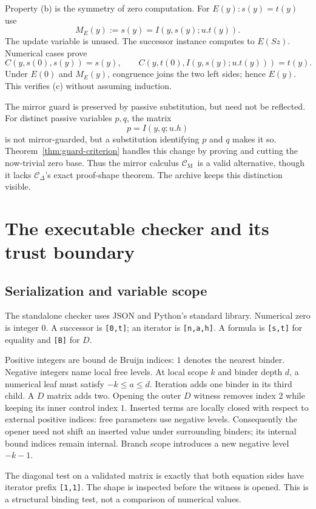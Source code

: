 \documentclass[11pt]{article}
\theoremstyle{definition}\newtheorem{definition}[theorem]{Definition}
\theoremstyle{remark}\newtheorem{remark}[theorem]{Remark}
\newcommand{\Cd}{\ensuremath{\mathcal C_{\Delta}}}
\newcommand{\Cm}{\ensuremath{\mathcal C_{\mathrm M}}}
\begin{document}
Property (b) is the symmetry of zero computation. For $E(y):s(y)=t(y)$ use
\[
 M_E(y):=s(y)=I(y,s(y);u.t(y)).
\]
The update variable is unused. The successor instance computes to $E(Sz)$. Numerical cases prove
\[
 C(y,s(0),s(y))=s(y),\qquad
 C(y,t(0),I(y,s(y);u.t(y)))=t(y).
\]
Under $E(0)$ and $M_E(y)$, congruence joins the two left sides; hence $E(y)$. This verifies (c) without assuming induction.

The mirror guard is preserved by passive substitution, but need not be reflected. For distinct passive variables $p,q$, the matrix
\[
 p=I(y,q;u.h)
\]
is not mirror-guarded, but a substitution identifying $p$ and $q$ makes it so. Theorem~\ref{thm:guard-criterion} handles this change by proving and cutting the now-trivial zero base. Thus the mirror calculus \Cm\ is a valid alternative, though it lacks \Cd's exact proof-shape theorem. The archive keeps this distinction visible.

\section{The executable checker and its trust boundary}
\label{sec:implementation}

\subsection{Serialization and variable scope}

The standalone checker uses JSON and Python's standard library. Numerical zero is integer $0$. A successor is \texttt{[0,t]}; an iterator is \texttt{[n,a,h]}. A formula is \texttt{[s,t]} for equality and \texttt{[B]} for $D$.

Positive integers are bound de Bruijn indices: $1$ denotes the nearest binder. Negative integers name local free levels. At local scope $k$ and binder depth $d$, a numerical leaf must satisfy $-k\leq a\leq d$. Iteration adds one binder in its third child. A $D$ matrix adds two. Opening the outer $D$ witness removes index $2$ while keeping its inner control index $1$. Inserted terms are locally closed with respect to external positive indices: free parameters use negative levels. Consequently the opener need not shift an inserted value under surrounding binders; its internal bound indices remain internal. Branch scope introduces a new negative level $-k-1$.

The diagonal test on a validated matrix is exactly that both equation sides have iterator prefix \texttt{[1,1]}. The shape is inspected before the witness is opened. This is a structural binding test, not a comparison of numerical values.
\end{document}
